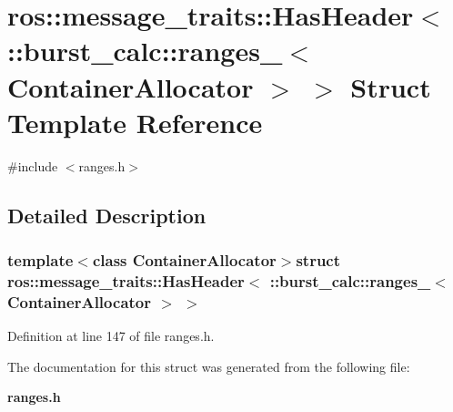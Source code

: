\section{ros\-:\-:message\-\_\-traits\-:\-:\-Has\-Header$<$ \-:\-:burst\-\_\-calc\-:\-:ranges\-\_\-$<$ \-Container\-Allocator $>$ $>$ \-Struct \-Template \-Reference}
\label{structros_1_1message__traits_1_1HasHeader_3_01_1_1burst__calc_1_1ranges___3_01ContainerAllocator_01_4_01_4}


{\ttfamily \#include $<$ranges.\-h$>$}



\subsection{\-Detailed \-Description}
\subsubsection*{template$<$class Container\-Allocator$>$struct ros\-::message\-\_\-traits\-::\-Has\-Header$<$ \-::burst\-\_\-calc\-::ranges\-\_\-$<$ Container\-Allocator $>$ $>$}



\-Definition at line 147 of file ranges.\-h.



\-The documentation for this struct was generated from the following file\-:\begin{DoxyCompactItemize}
\item 
{\bf ranges.\-h}\end{DoxyCompactItemize}
